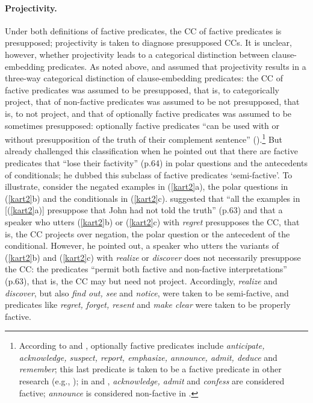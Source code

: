 \documentclass[11pt,fleqn]{article}
\newcommand{\6}{\mbox{$[\hspace*{-.6mm}[$}}
\newcommand{\9}{\mbox{$]\hspace*{-.6mm}]$}}
\begin{document}
\paragraph{Projectivity.} Under both definitions of factive predicates, the CC of factive predicates is presupposed; projectivity is taken to diagnose presupposed CCs. It is unclear, however, whether projectivity leads to a categorical distinction between clause-embedding predicates. As noted above, \citet{kiparsky-kiparsky70} and \citet{karttunen71-implicative} assumed that projectivity results in a three-way categorical distinction of clause-embedding predicates:  the CC of factive predicates was assumed to be presupposed, that is, to categorically project, that of non-factive predicates was assumed to be not presupposed, that is, to not project, and that of optionally factive predicates was assumed to be sometimes presupposed: optionally factive predicates ``can be used with or without presupposition of the truth of their complement sentence'' (\citealt[340]{karttunen71-implicative}).\footnote{According to \citet{kiparsky-kiparsky70} and \citet{karttunen71-implicative}, optionally factive predicates include {\em anticipate, acknowledge, suspect, report, emphasize, announce, admit, deduce} and {\em remember}; this last predicate is taken to be a factive predicate in other research (e.g., \citealt{simons07,kastner2015,abrusan2016,karttunen2016,aravind-hackl2017,cremers2018}); in \citealt{karttunen-zaenen2005} and \citealt{karttunen2016}, {\em acknowledge, admit} and {\em confess} are considered factive; {\em announce} is considered non-factive in \citealt{karttunen-zaenen2005}.} But \citet{karttunen71b} already challenged this classification when he pointed out that there are factive predicates that ``lose their factivity'' (p.64) in polar questions and the antecedents of conditionals; he dubbed this subclass of factive predicates `semi-factive'. To illustrate, consider the negated examples in (\ref{kart2}a), the polar questions in (\ref{kart2}b) and the conditionals in (\ref{kart2}c). \citet{karttunen71b} suggested that ``all the examples in [(\ref{kart2}a)] presuppose that John had not told the truth'' (p.63) and that a speaker who utters (\ref{kart2}b) or (\ref{kart2}c) with {\em regret} presupposes the CC, that is, the CC projects over negation, the polar question or  the antecedent of the conditional. However, he pointed out, a speaker who utters the variants of (\ref{kart2}b) and (\ref{kart2}c) with {\em realize} or {\em discover} does not necessarily presuppose the CC: the predicates ``permit both factive and non-factive interpretations'' (p.63), that is, the CC may but need not project. Accordingly, {\em realize} and {\em discover}, but also {\em find out, see} and {\em notice}, were taken to be semi-factive, and predicates like {\em regret, forget, resent} and {\em make clear}  were taken to be properly factive.
\end{document}
